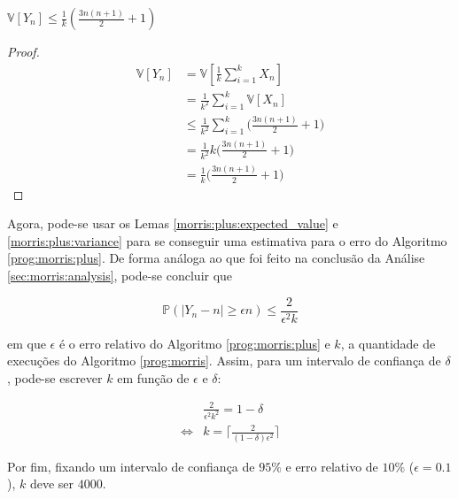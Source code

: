 \begin{lemma}\label{morris:plus:variance}
  $\mathbb{V}[Y_n] \leq \frac{1}{k} ( \frac{3n(n+1)}{2} + 1 )$
\end{lemma}

\begin{proof}
  
\begin{align*}
  \mathbb{V}[Y_n] 
    &= \mathbb{V}[\frac{1}{k} \sum_{i=1}^{k} X_n] \\
    &= \frac{1}{k^2} \sum_{i=1}^{k}\mathbb{V}[X_n]  \\
    &\leq \frac{1}{k^2} \sum_{i=1}^{k} \Big( \frac{3n(n+1)}{2} + 1 \Big)  \\
    &= \frac{1}{k^2} k \Big( \frac{3n(n+1)}{2} + 1 \Big)  \\
    &= \frac{1}{k} \Big( \frac{3n(n+1)}{2} + 1 \Big)
\end{align*}

\end{proof}

Agora, pode-se usar os Lemas \ref{morris:plus:expected_value} e \ref{morris:plus:variance} para se conseguir uma estimativa para o 
erro do Algoritmo \ref{prog:morris:plus}. De forma análoga ao que foi feito na conclusão da Análise \ref{sec:morris:analysis}, pode-se 
concluir que

\[ \mathbb{P}(|Y_n - n| \geq \epsilon n ) \leq \frac{2}{\epsilon^2 k}\]

em que $\epsilon$ é o erro relativo do Algoritmo \ref{prog:morris:plus} e $k$, a quantidade de execuções do Algoritmo \ref{prog:morris}.
Assim, para um intervalo de confiança de $\delta$, pode-se escrever $k$ em função de $\epsilon$ e $\delta$:

\begin{align*}
      &\frac{2}{\epsilon^2 k^2} = 1 - \delta \\
  \iff& k = \Bigg\lceil \frac{2}{(1 - \delta) \epsilon^2} \Bigg\rceil
\end{align*}

Por fim, fixando um intervalo de confiança de $95\%$ e erro relativo de $10\%$ ($\epsilon = 0.1$), $k$ deve ser $4000$.  
